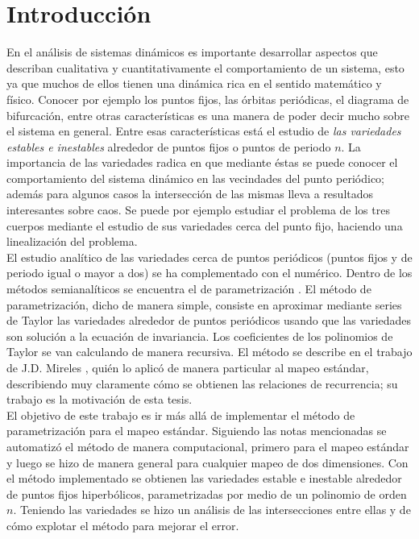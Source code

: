 
\chapter{Introducción}
En el análisis de sis\-te\-mas di\-ná\-mi\-cos es importante desarrollar aspectos que describan cualitativa y cuantitativamente el comportamiento de un sistema, esto ya que muchos de ellos tienen una dinámica rica en el sentido matemático y físico. Conocer por ejemplo los puntos fijos, las órbitas periódicas, el diagrama de bifurcación, entre otras características es una manera de poder decir mucho sobre el sistema en general. Entre esas características está el estudio de \textit{las variedades estables e inestables} alrededor de puntos fijos o puntos de periodo $n$. La importancia de las variedades radica en que mediante éstas se puede conocer el comportamiento del sistema dinámico en las vecindades del punto periódico; además para algunos casos la intersección de las mismas lleva a resultados interesantes sobre caos. Se puede por ejemplo estudiar el problema de los tres cuerpos mediante el estudio de sus variedades cerca del punto fijo, haciendo una linealización del problema. \citep{gerald}\\


El estudio analítico de las variedades cerca de puntos periódicos (puntos fijos y de periodo igual o mayor a dos) se ha complementado con el numérico. Dentro de los métodos semianalíticos se encuentra el de parametrización \citep{Haro}. El método de pa\-ra\-me\-tri\-za\-ción, dicho de manera simple, consiste en aproximar mediante series de Taylor las variedades alrededor de puntos periódicos usando que las variedades son solución a la ecuación de invariancia. Los coeficientes de los polinomios de Taylor se van calculando de manera recursiva. El método se describe en el trabajo de J.D. Mireles \citep{Mireles}, quién  lo aplicó de manera particular al mapeo estándar, describiendo muy claramente cómo se obtienen las relaciones de recurrencia; su trabajo es la motivación de esta tesis.\\



El objetivo de este trabajo es ir más allá de implementar el método de pa\-ra\-me\-tri\-za\-ción para el mapeo estándar. Siguiendo las notas mencionadas se automatizó el método de manera computacional, primero para el mapeo estándar y luego se hizo de manera general para cualquier mapeo de dos dimensiones. Con el método implementado se obtienen las variedades estable e inestable alrededor de puntos fijos hi\-per\-bó\-li\-cos, pa\-ra\-me\-tri\-za\-das por medio de un polinomio de orden $n$.
Teniendo las variedades se hizo un análisis de las intersecciones entre ellas y de cómo explotar el método para mejorar el error.
 
